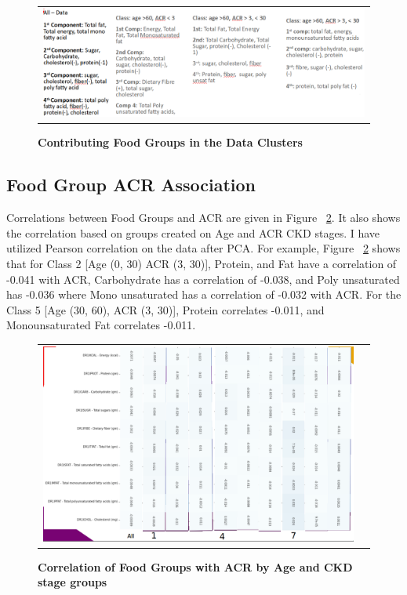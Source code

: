 \begin{figure}
\begin{tabular}{c}
\includegraphics[scale=1]{images/important-features-food-groups.png} \\
\end{tabular}
\caption{\textbf{Contributing Food Groups in the Data Clusters}}
\label{cluster-food-contribution}
\vspace{0.25cm}
\end{figure}

\subsection{Food Group ACR Association}
Correlations between Food Groups and ACR are given in Figure ~\ref{corr-acr-food}. It also shows the correlation based on groups created on Age and ACR CKD stages. I have utilized Pearson correlation on the data after PCA. For example, Figure ~\ref{corr-acr-food} shows
that for Class 2 [Age (0, 30) ACR (3, 30)], Protein, and Fat have a correlation of -0.041 with ACR, Carbohydrate has a correlation of -0.038, and Poly unsaturated has -0.036 where Mono unsaturated has a correlation of -0.032 with ACR. For the Class 5 [Age (30, 60), ACR (3, 30)], Protein correlates -0.011, and Monounsaturated Fat correlates -0.011.


\begin{figure}
\begin{tabular}{cc}
\includegraphics[scale=0.7]{images/groups-and-foods-and-correlations} \\
\end{tabular}
\caption{\textbf{Correlation of Food Groups with ACR by Age and CKD stage groups}}
\label{corr-acr-food}
\vspace{0.25cm}
\end{figure}


